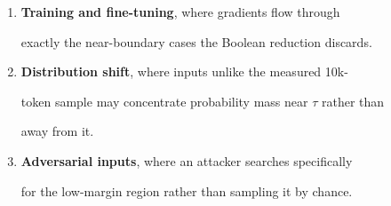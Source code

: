 \begin{enumerate}





  \item \textbf{Training and fine-tuning}, where gradients flow through





    exactly the near-boundary cases the Boolean reduction discards.





  \item \textbf{Distribution shift}, where inputs unlike the measured 10k-





    token sample may concentrate probability mass near $\tau$ rather than





    away from it.





  \item \textbf{Adversarial inputs}, where an attacker searches specifically





    for the low-margin region rather than sampling it by chance.





\end{enumerate}











